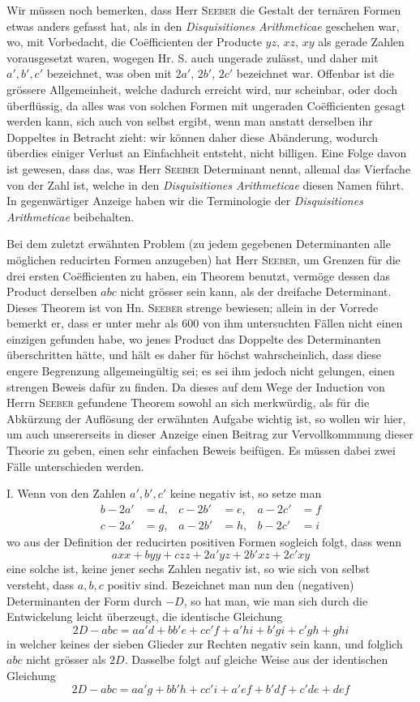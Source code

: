 Wir müssen noch bemerken, dass Herr \textsc{Seeber} die Gestalt der ternären Formen etwas anders gefasst hat, als in den \emph{Disquisitiones Arithmeticae} geschehen war, wo, mit Vorbedacht, die Coëfficienten der Producte $yz$, $xz$, $xy$ als gerade Zahlen vorausgesetzt waren, wogegen Hr. S. auch ungerade zulässt, und daher
%
mit $a',b',c'$ bezeichnet, was oben mit $2a'$, $2b'$, $2c'$ bezeichnet war. Offenbar ist die grössere Allgemeinheit, welche dadurch erreicht wird, nur scheinbar, oder doch überflüssig, da alles was von solchen Formen mit ungeraden Coëfficienten gesagt werden kann, sich auch von selbst ergibt, wenn man anstatt derselben ihr Doppeltes in Betracht zieht: wir können daher diese Abänderung, wodurch überdies einiger Verlust an Einfachheit entsteht, nicht billigen. Eine Folge davon ist gewesen, dass das, was Herr \textsc{Seeber} Determinant nennt, allemal das Vierfache von der Zahl ist, welche in den \emph{Disquisitiones Arithmeticae} diesen Namen führt. In gegenwärtiger Anzeige haben wir die Terminologie der \emph{Disquisitiones Arithmeticae} beibehalten.

Bei dem zuletzt erwähnten Problem (zu jedem gegebenen Determinanten alle möglichen reducirten Formen anzugeben) hat Herr \textsc{Seeber}, um Grenzen für die drei ersten Coëfficienten zu haben, ein Theorem benutzt, vermöge dessen das Product derselben $abc$ nicht grösser sein kann, als der dreifache Determinant. Dieses Theorem ist von Hn. \textsc{Seeber} strenge bewiesen; allein in der Vorrede bemerkt er, dass er unter mehr als 600 von ihm untersuchten Fällen nicht einen einzigen gefunden habe, wo jenes Product das Doppelte des Determinanten überschritten hätte, und hält es daher für höchst wahrscheinlich, dass diese engere Begrenzung allgemeingültig sei; es sei ihm jedoch nicht gelungen, einen strengen Beweis dafür zu finden. Da dieses auf dem Wege der Induction von Herrn \textsc{Seeber} gefundene Theorem sowohl an sich merkwürdig, als für die Abkürzung der Auflösung der erwähnten Aufgabe wichtig ist, so wollen wir hier, um auch unsererseits in dieser Anzeige einen Beitrag zur Vervollkommnung dieser Theorie zu geben, einen sehr einfachen Beweis beifügen. Es müssen dabei zwei Fälle unterschieden werden.

I. Wenn von den Zahlen $a',b',c'$ keine negativ ist, so setze man
\[
\begin{aligned}
b-2a'&=d,&c-2b'&=e,&a-2c'&=f\\
c-2a'&=g,&a-2b'&=h,&b-2c'&=i
\end{aligned}
\]
wo aus der Definition der reducirten positiven Formen sogleich folgt, dass wenn
\[
axx+byy+czz+2a'yz+2b'xz+2c'xy
\]
eine solche ist, keine jener sechs Zahlen negativ ist, so wie sich von selbst versteht, dass $a,b,c$ positiv sind. Bezeichnet man nun den (negativen) 
%
Determinanten der Form durch $-D$, so hat man, wie man sich durch die Entwickelung leicht überzeugt, die identische Gleichung
\[
2D-abc=aa'd+bb'e+cc'f+a'hi+b'gi+c'gh+ghi
\]
in welcher keines der sieben Glieder zur Rechten negativ sein kann, und folglich $abc$ nicht grösser als $2D$. Dasselbe folgt auf gleiche Weise aus der identischen Gleichung
\[
2D-abc=aa'g+bb'h+cc'i+a'ef+b'df+c'de+def
\]


